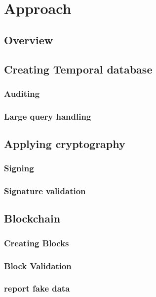 \chapter{Approach}
\label{chap:approach}

\section{Overview}
\section{Creating Temporal database}
\subsection{Auditing}
\subsection{Large query handling}
\section{Applying cryptography}
\subsection{Signing}
\subsection{Signature validation}
\section{Blockchain}
\subsection{Creating Blocks}
\subsection{Block Validation}
\subsection{report fake data}

